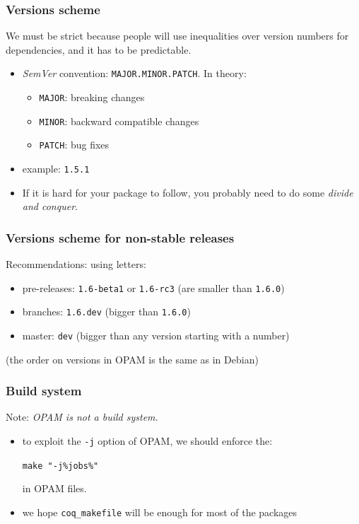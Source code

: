 \documentclass{beamer}
\begin{document}
  \begin{frame}
    \frametitle{Versions scheme}
    We must be strict because people will use inequalities over version numbers for dependencies, and it has to be predictable.
    \begin{itemize}
      \item \emph{SemVer} convention: \texttt{MAJOR.MINOR.PATCH}. In theory:
        \begin{itemize}
          \item \texttt{MAJOR}: breaking changes
          \item \texttt{MINOR}: backward compatible changes
          \item \texttt{PATCH}: bug fixes
        \end{itemize}
      \item example: \texttt{1.5.1}
      \item If it is hard for your package to follow, you probably need to do some \emph{divide and conquer}.
    \end{itemize}
  \end{frame}
  \begin{frame}
    \frametitle{Versions scheme for non-stable releases}
    Recommendations: using letters:
    \begin{itemize}
      \item pre-releases: \texttt{1.6-beta1} or \texttt{1.6-rc3} (are smaller than \texttt{1.6.0})
      \item branches: \texttt{1.6.dev} (bigger than \texttt{1.6.0})
      \item master: \texttt{dev} (bigger than any version starting with a number)
    \end{itemize}
    (the order on versions in OPAM is the same as in Debian)
  \end{frame}
  \begin{frame}
    \frametitle{Build system}
    Note: \emph{OPAM is not a build system.}
    \begin{itemize}
      \item to exploit the \texttt{-j} option of OPAM, we should enforce the:
        \begin{center}
          \texttt{make "-j\%{jobs}\%"}
        \end{center}
        in OPAM files.
      \item we hope \texttt{coq\_makefile} will be enough for most of the packages
    \end{itemize}
  \end{frame}
\end{document}

